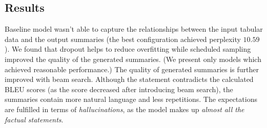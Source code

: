 \subsection{Results}

Baseline model wasn't able to capture the relationships between the input tabular data and the output summaries (the best configuration achieved perplexity $10.59$). We found that dropout helps to reduce overfitting while scheduled sampling improved the quality of the generated summaries. (We present only models which achieved reasonable performance.) The quality of generated summaries is further improved with beam search. Although the statement contradicts the calculated BLEU scores (as the score decreased after introducing beam search), the summaries contain more natural language and less repetitions. The expectations are fulfilled in terms of \emph{hallucinations}, as the model makes up \emph{almost all the factual statements}.

\begin{table}[h]
    \centering
    \caption{Performance metrics on the baseline models.} \label{table:metrics_baseline}
\end{table}

